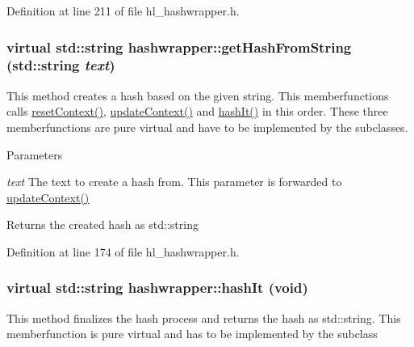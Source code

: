 Definition at line 211 of file hl\_\-hashwrapper.h.\hypertarget{classhashwrapper_aa10904f0dc06eb54771ab26864622d0f}{
\subsubsection[{getHashFromString}]{\setlength{\rightskip}{0pt plus 5cm}virtual std::string hashwrapper::getHashFromString (std::string {\em text})}}
\label{classhashwrapper_aa10904f0dc06eb54771ab26864622d0f}


This method creates a hash based on the given string. This memberfunctions calls \hyperlink{classhashwrapper_aa7d46e9630a794ff08cfb5307660a86d}{resetContext()}, \hyperlink{classhashwrapper_a7fe42ccf310e7d2cfe95f61732b73197}{updateContext()} and \hyperlink{classhashwrapper_a53f97c06885ed2b1fa255759a957a782}{hashIt()} in this order. These three memberfunctions are pure virtual and have to be implemented by the subclasses.


\begin{DoxyParams}{Parameters}
\item[{\em text}]The text to create a hash from. This parameter is forwarded to \hyperlink{classhashwrapper_a7fe42ccf310e7d2cfe95f61732b73197}{updateContext()} \end{DoxyParams}
\begin{DoxyReturn}{Returns}
the created hash as std::string 
\end{DoxyReturn}


Definition at line 174 of file hl\_\-hashwrapper.h.\hypertarget{classhashwrapper_a53f97c06885ed2b1fa255759a957a782}{
\subsubsection[{hashIt}]{\setlength{\rightskip}{0pt plus 5cm}virtual std::string hashwrapper::hashIt (void)}}
\label{classhashwrapper_a53f97c06885ed2b1fa255759a957a782}


This method finalizes the hash process and returns the hash as std::string. This memberfunction is pure virtual and has to be implemented by the subclass

